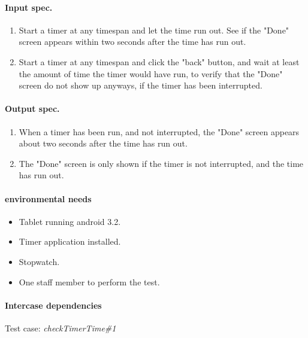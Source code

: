 \paragraph{Input spec.}
	\begin{enumerate}
		\item Start a timer at any timespan and let the time run out. See if the "Done" screen appears within two seconds after the time has run out.
		\item Start a timer at any timespan and click the "back" button, and wait at least the amount of time the timer would have run, to verify that the "Done" screen do not show up anyways, if the timer has been interrupted.
	\end{enumerate}
\paragraph{Output spec.}
	\begin{enumerate}
		\item When a timer has been run, and not interrupted, the "Done" screen appears about two seconds after the time has run out.
		\item The "Done" screen is only shown if the timer is not interrupted, and the time has run out.
	\end{enumerate}
\paragraph{environmental needs}
	\begin{itemize}
		\item Tablet running android 3.2.
		\item Timer application installed.
		\item Stopwatch.
		\item One staff member to perform the test.
	\end{itemize}
\paragraph{Intercase dependencies}
	Test case: \textit{checkTimerTime\#1}